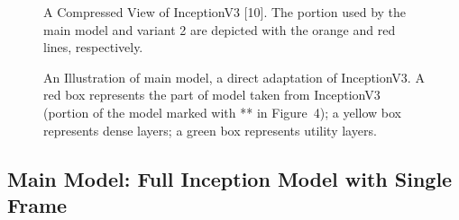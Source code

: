 \documentclass[letterpaper, 10 pt, conference]{ieeeconf}  %
\begin{document}
\begin{figure}[!htb]
        \caption{\label{fig: InceptionV3} A Compressed View of InceptionV3 [10]. The portion used by the main model and variant 2 are depicted with the orange and red lines, respectively.}
     \end{figure}
 \begin{figure}[!htb]
        \caption{\label{fig: Main Model} An Illustration of main model, a direct adaptation of InceptionV3. A red box represents the part of model taken from InceptionV3 (portion of the model marked with ** in Figure~4); a yellow box represents dense layers; a green box represents utility layers.}
      \end{figure}
      
\subsection{Main Model: Full Inception Model with Single Frame}\label{sec:mainmodel}
\end{document}
